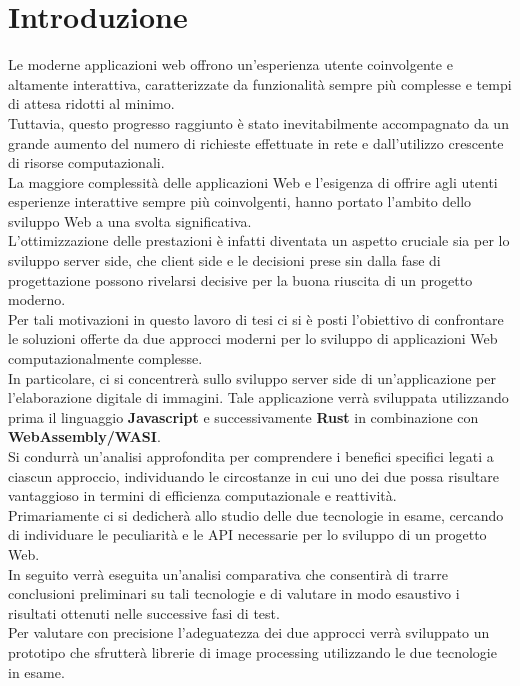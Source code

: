 \chapter*{Introduzione}
\label{Introduzione}
Le moderne applicazioni web offrono un'esperienza utente coinvolgente e altamente interattiva, caratterizzate da funzionalità sempre più complesse e tempi di attesa ridotti al minimo.
\\Tuttavia, questo progresso raggiunto è stato inevitabilmente accompagnato da un grande aumento del numero di richieste effettuate in rete e dall'utilizzo crescente di risorse computazionali.
\\La maggiore complessità delle applicazioni Web e l’esigenza di offrire agli utenti esperienze interattive sempre più coinvolgenti, hanno portato l’ambito dello sviluppo Web a una svolta significativa.
\\L’ottimizzazione delle prestazioni è infatti diventata un aspetto cruciale sia per lo sviluppo server side, che client side e le decisioni prese sin dalla fase di progettazione possono rivelarsi decisive per la buona riuscita di un progetto moderno.
\\Per tali motivazioni in questo lavoro di tesi ci si è posti l'obiettivo di confrontare le soluzioni offerte da due approcci moderni per lo sviluppo di applicazioni Web computazionalmente complesse.
\\In particolare, ci si concentrerà sullo sviluppo server side di un'applicazione per l'elaborazione digitale di immagini.
Tale applicazione verrà sviluppata utilizzando prima il linguaggio \textbf{Javascript} e successivamente \textbf{Rust} in combinazione con \textbf{WebAssembly/WASI}.
\\Si condurrà un'analisi approfondita per comprendere i benefici specifici legati a ciascun approccio, individuando le circostanze in cui uno dei due possa risultare vantaggioso in termini di efficienza computazionale e reattività.
\\Primariamente ci si dedicherà allo studio delle due tecnologie in esame, cercando di individuare le peculiarità e le API necessarie per lo sviluppo di un progetto Web.
\\In seguito verrà eseguita un'analisi comparativa che consentirà di trarre conclusioni preliminari su tali tecnologie e di valutare in modo esaustivo i risultati ottenuti nelle successive fasi di test.
\\Per valutare con precisione l'adeguatezza dei due approcci verrà sviluppato un prototipo che sfrutterà librerie di image processing utilizzando le due tecnologie in esame.
